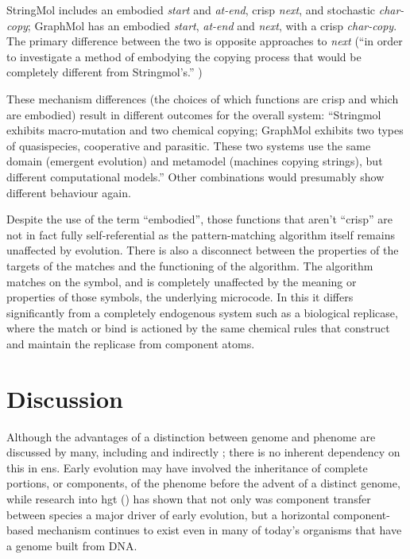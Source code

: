StringMol includes an embodied \emph{start} and \emph{at-end}, crisp \emph{next}, and stochastic \emph{char-copy}; GraphMol has an embodied \emph{start}, \emph{at-end} and \emph{next}, with a crisp \emph{char-copy}. The primary difference between the two is opposite approaches to \emph{next} (``in order to investigate a method of embodying the copying process that would be completely different from Stringmol's.'' \parencite[p.145]{Nellis2012})

These mechanism differences (the choices of which functions are crisp and which are embodied) result in different outcomes for the overall system: ``Stringmol exhibits macro-mutation and two chemical copying; GraphMol exhibits two types of quasispecies, cooperative and parasitic. These two systems use the same domain (emergent evolution) and metamodel (machines copying strings), but different computational models.'' Other combinations would presumably show different behaviour again.

Despite the use of the term ``embodied'', those functions that aren't ``crisp'' are not in fact fully self-referential as the pattern-matching algorithm itself remains unaffected by evolution. There is also a disconnect between the properties of the targets of the matches and the functioning of the algorithm. The algorithm matches on the symbol, and is completely unaffected by the meaning or properties of those symbols, the underlying microcode. In this it differs significantly from a completely endogenous system such as a biological replicase, where the match or bind is actioned by the same chemical rules that construct and maintain the replicase from component atoms.


\section{Discussion}
Although the advantages of a distinction between genome and phenome are discussed by many, including \parencite[section 7.2.3]{Taylor1999} and indirectly \textcite{VonNeumann1966}; there is no inherent dependency on this in \gls{ens}. Early evolution may have involved the inheritance of complete portions, or components, of the phenome before the advent of a distinct genome, while research into \gls{hgt} (\eg \textcite{Ochman2000,Pace:2008vi,Ragan2009}) has shown that not only was component transfer between species a major driver of early evolution, but a horizontal component-based mechanism continues to exist even in many of today's organisms that have a genome built from DNA. 


